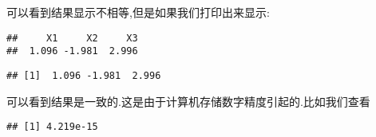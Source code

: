 \documentclass[]{ctexbook}
\newenvironment{Shaded}{\begin{snugshade}}{\end{snugshade}}
\newcommand{\DataTypeTok}[1]{\textcolor[rgb]{0.13,0.29,0.53}{#1}}
\newcommand{\DecValTok}[1]{\textcolor[rgb]{0.00,0.00,0.81}{#1}}
\newcommand{\KeywordTok}[1]{\textcolor[rgb]{0.13,0.29,0.53}{\textbf{#1}}}
\newcommand{\NormalTok}[1]{#1}
\newcommand{\OperatorTok}[1]{\textcolor[rgb]{0.81,0.36,0.00}{\textbf{#1}}}
\begin{document}
可以看到结果显示不相等,但是如果我们打印出来显示:

\begin{Shaded}
\end{Shaded}

\begin{verbatim}
##     X1     X2     X3 
##  1.096 -1.981  2.996
\end{verbatim}

\begin{Shaded}
\end{Shaded}

\begin{verbatim}
## [1]  1.096 -1.981  2.996
\end{verbatim}

可以看到结果是一致的.这是由于计算机存储数字精度引起的.比如我们查看

\begin{Shaded}
\end{Shaded}

\begin{verbatim}
## [1] 4.219e-15
\end{verbatim}
\end{document}
